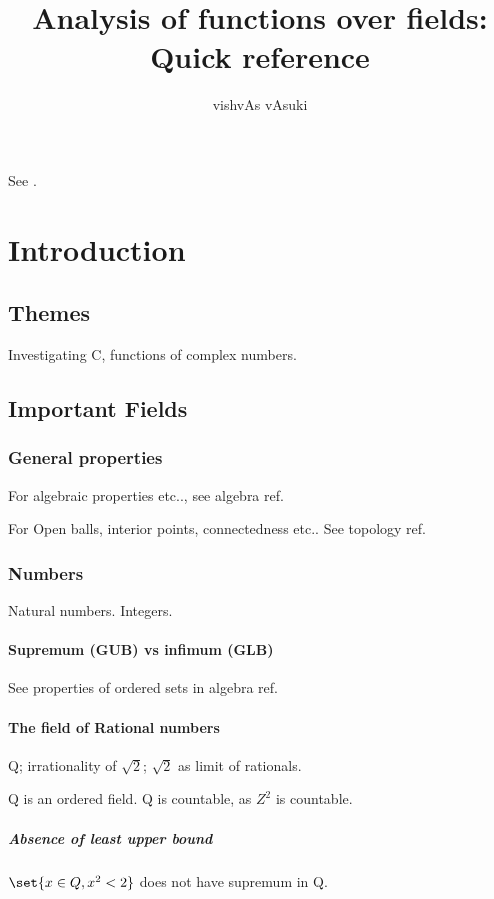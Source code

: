 \documentclass[oneside, article]{memoir}
\title{Analysis of functions over fields: Quick reference}
\author{vishvAs vAsuki}
\begin{document}
\maketitle
\tableofcontents

See \cite{rudin76ana}.

\part{Introduction}


\chapter{Themes}
Investigating C, functions of complex numbers.

\chapter{Important Fields}
\section{General properties}
For algebraic properties etc.., see algebra ref.

For Open balls, interior points, connectedness etc.. See topology ref.

\section{Numbers}
Natural numbers. Integers.

\subsection{Supremum (GUB) vs infimum (GLB)}
See properties of ordered sets in algebra ref.

\subsection{The field of Rational numbers}
Q; irrationality of $\sqrt{2}$; $\sqrt{2}$ as limit of rationals.

Q is an ordered field. Q is countable, as $Z^{2}$ is countable.

\subsubsection{Absence of least upper bound}
$\set{x \in Q, x^{2}< 2}$ does not have supremum in Q.
\end{document}
